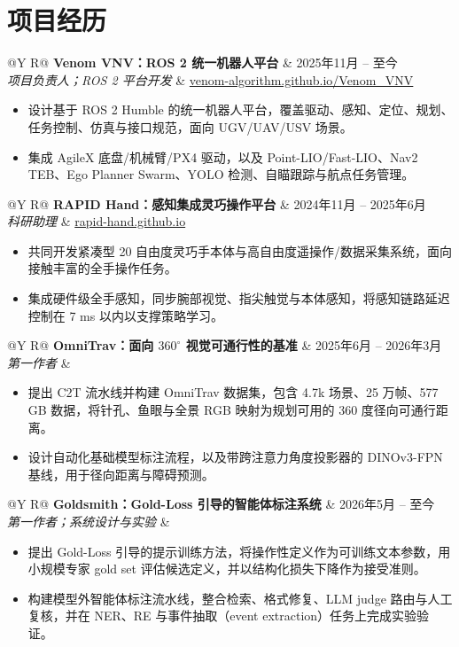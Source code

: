 \documentclass[10pt,letterpaper]{article}
\makeatletter
\newcommand{\projectentry}[4]{%
  \begin{tabularx}{\textwidth}{@{}Y R@{}}
    \textbf{#1} & #2 \\
    \textit{#3} & {\footnotesize #4}
  \end{tabularx}
}
\newenvironment{cvitems}
  {\begin{itemize}[leftmargin=1.2em,itemsep=1.5pt,topsep=2pt,parsep=0pt,partopsep=0pt]}
  {\end{itemize}}
\makeatother
\begin{document}
\newpage

\section*{项目经历}

\projectentry{Venom VNV：ROS 2 统一机器人平台}
{2025年11月 -- 至今}
{项目负责人；ROS 2 平台开发}
{\href{https://venom-algorithm.github.io/Venom_VNV/}{venom-algorithm.github.io/Venom\_VNV}}
\begin{cvitems}
  \item 设计基于 ROS 2 Humble 的统一机器人平台，覆盖驱动、感知、定位、规划、任务控制、仿真与接口规范，面向 UGV/UAV/USV 场景。
  \item 集成 AgileX 底盘/机械臂/PX4 驱动，以及 Point-LIO/Fast-LIO、Nav2 TEB、Ego Planner Swarm、YOLO 检测、自瞄跟踪与航点任务管理。
\end{cvitems}

\projectentry{RAPID Hand：感知集成灵巧操作平台}
{2024年11月 -- 2025年6月}
{科研助理}
{\href{https://rapid-hand.github.io/}{rapid-hand.github.io}}
\begin{cvitems}
  \item 共同开发紧凑型 20 自由度灵巧手本体与高自由度遥操作/数据采集系统，面向接触丰富的全手操作任务。
  \item 集成硬件级全手感知，同步腕部视觉、指尖触觉与本体感知，将感知链路延迟控制在 7 ms 以内以支撑策略学习。
\end{cvitems}

\projectentry{OmniTrav：面向 $360^\circ$ 视觉可通行性的基准}
{2025年6月 -- 2026年3月}
{第一作者}
{}
\begin{cvitems}
  \item 提出 C2T 流水线并构建 OmniTrav 数据集，包含 4.7k 场景、25 万帧、577 GB 数据，将针孔、鱼眼与全景 RGB 映射为规划可用的 360 度径向可通行距离。
  \item 设计自动化基础模型标注流程，以及带跨注意力角度投影器的 DINOv3-FPN 基线，用于径向距离与障碍预测。
\end{cvitems}

\projectentry{Goldsmith：Gold-Loss 引导的智能体标注系统}
{2026年5月 -- 至今}
{第一作者；系统设计与实验}
{}
\begin{cvitems}
  \item 提出 Gold-Loss 引导的提示训练方法，将操作性定义作为可训练文本参数，用小规模专家 gold set 评估候选定义，并以结构化损失下降作为接受准则。
  \item 构建模型外智能体标注流水线，整合检索、格式修复、LLM judge 路由与人工复核，并在 NER、RE 与事件抽取（event extraction）任务上完成实验验证。
\end{cvitems}
\end{document}
